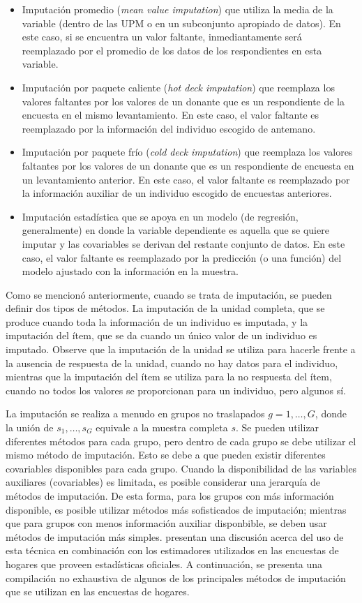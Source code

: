\documentclass[12pt,spanish,]{book}
\providecommand{\tightlist}{%
  \setlength{\itemsep}{0pt}\setlength{\parskip}{0pt}}
\begin{document}
\begin{itemize}
\tightlist
\item
  Imputación promedio (\emph{mean value imputation}) que utiliza la media de la variable (dentro de las UPM o en un subconjunto apropiado de datos). En este caso, si se encuentra un valor faltante, inmediantamente será reemplazado por el promedio de los datos de los respondientes en esta variable.
\item
  Imputación por paquete caliente (\emph{hot deck imputation}) que reemplaza los valores faltantes por los valores de un donante que es un respondiente de la encuesta en el mismo levantamiento. En este caso, el valor faltante es reemplazado por la información del individuo escogido de antemano.
\item
  Imputación por paquete frío (\emph{cold deck imputation}) que reemplaza los valores faltantes por los valores de un donante que es un respondiente de encuesta en un levantamiento anterior. En este caso, el valor faltante es reemplazado por la información auxiliar de un individuo escogido de encuestas anteriores.
\item
  Imputación estadística que se apoya en un modelo (de regresión, generalmente) en donde la variable dependiente es aquella que se quiere imputar y las covariables se derivan del restante conjunto de datos. En este caso, el valor faltante es reemplazado por la predicción (o una función) del modelo ajustado con la información en la muestra.
\end{itemize}

Como se mencionó anteriormente, cuando se trata de imputación, se pueden definir dos tipos de métodos. La imputación de la unidad completa, que se produce cuando toda la información de un individuo es imputada, y la imputación del ítem, que se da cuando un único valor de un individuo es imputado. Observe que la imputación de la unidad se utiliza para hacerle frente a la ausencia de respuesta de la unidad, cuando no hay datos para el individuo, mientras que la imputación del ítem se utiliza para la no respuesta del ítem, cuando no todos los valores se proporcionan para un individuo, pero algunos sí.

La imputación se realiza a menudo en grupos no traslapados \(g= 1, \ldots, G\), donde la unión de \(s_1, \ldots, s_G\) equivale a la muestra completa \(s\). Se pueden utilizar diferentes métodos para cada grupo, pero dentro de cada grupo se debe utilizar el mismo método de imputación. Esto se debe a que pueden existir diferentes covariables disponibles para cada grupo. Cuando la disponibilidad de las variables auxiliares (covariables) es limitada, es posible considerar una jerarquía de métodos de imputación. De esta forma, para los grupos con más información disponible, es posible utilizar métodos más sofisticados de imputación; mientras que para grupos con menos información auxiliar disponbible, se deben usar métodos de imputación más simples. \textcite{Sarndal_Lundstrom_2006} presentan una discusión acerca del uso de esta técnica en combinación con los estimadores utilizados en las encuestas de hogares que proveen estadísticas oficiales. A continuación, se presenta una compilación no exhaustiva de algunos de los principales métodos de imputación que se utilizan en las encuestas de hogares.
\end{document}
